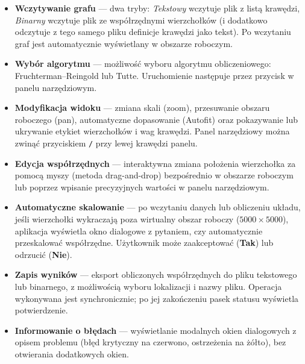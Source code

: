 \documentclass[a4paper, 11pt]{article}
\begin{document}
\begin{itemize}
  \item \textbf{Wczytywanie grafu} --- dwa tryby: \textit{Tekstowy} wczytuje plik z listą krawędzi, \textit{Binarny} wczytuje plik ze współrzędnymi wierzchołków (i dodatkowo odczytuje z tego samego pliku definicje krawędzi jako tekst). Po wczytaniu graf jest automatycznie wyświetlany w obszarze roboczym.

  \item \textbf{Wyb\'or algorytmu} --- mo\.zliwo\'s\'c wyboru algorytmu obliczeniowego: Fruchterman–Reingold lub Tutte. Uruchomienie nast\k{e}puje przez przycisk w panelu narz\k{e}dziowym.

  \item \textbf{Modyfikacja widoku} --- zmiana skali (zoom), przesuwanie obszaru roboczego (pan), automatyczne dopasowanie (Autofit) oraz pokazywanie lub ukrywanie etykiet wierzcho\l{}k\'ow i wag kraw\k{e}dzi. Panel narz\k{e}dziowy mo\.zna zwin\k{a}\'c przyciskiem \texttt{\guillemotleft/\guillemotright} przy lewej kraw\k{e}dzi panelu.

  \item \textbf{Edycja wsp\'o\l{}rz\k{e}dnych} --- interaktywna zmiana po\l{}o\.zenia wierzcho\l{}ka za pomoc\k{a} myszy (metoda drag-and-drop) bezpo\'srednio w obszarze roboczym lub poprzez wpisanie precyzyjnych warto\'sci w panelu narz\k{e}dziowym.

  \item \textbf{Automatyczne skalowanie} --- po wczytaniu danych lub obliczeniu uk\l{}adu, je\'sli wierzcho\l{}ki wykraczaj\k{a} poza wirtualny obszar roboczy ($5000 \times 5000$), aplikacja wy\'swietla okno dialogowe z pytaniem, czy automatycznie przeskalowa\'c wsp\'o\l{}rz\k{e}dne. U\.zytkownik mo\.ze zaakceptowa\'c (\textbf{Tak}) lub odrzuci\'c (\textbf{Nie}).

  \item \textbf{Zapis wynik\'ow} --- eksport obliczonych wsp\'o\l{}rz\k{e}dnych do pliku tekstowego lub binarnego, z mo\.zliwo\'sci\k{a} wyboru lokalizacji i nazwy pliku. Operacja wykonywana jest synchronicznie; po jej zako\'nczeniu pasek statusu wy\'swietla potwierdzenie.

  \item \textbf{Informowanie o b\l{}\k{e}dach} --- wy\'swietlanie modalnych okien dialogowych z opisem problemu (b\l{}\k{e}d krytyczny na czerwono, ostrze\.zenia na \.z\'o\l{}to), bez otwierania dodatkowych okien.
\end{itemize}
\end{document}
